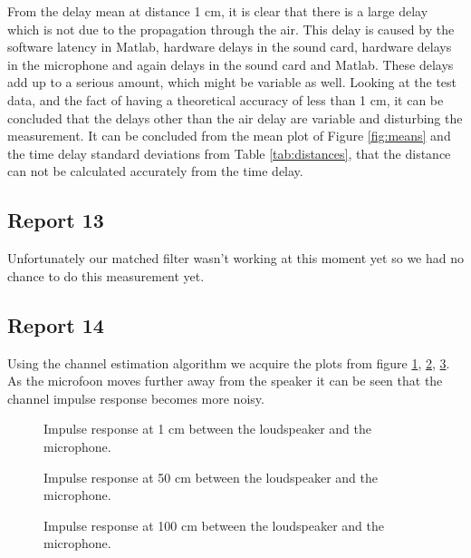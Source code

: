 \documentclass[final]{scrreprt} %
\begin{document}
From the delay mean at distance 1 cm, it is clear that there is a large delay which is not due to the propagation through the air.
This delay is caused by the software latency in Matlab, hardware delays in the sound card, hardware delays in the microphone and again delays in the sound card and Matlab.
These delays add up to a serious amount, which might be variable as well.
Looking at the test data, and the fact of having a theoretical accuracy of less than 1 cm, it can be concluded that the delays other than the air delay are variable and disturbing the measurement.
It can be concluded from the mean plot of Figure \ref{fig:means} and the time delay standard deviations from Table \ref{tab:distances}, that the distance can not be calculated accurately from the time delay.

\subsection{Report 13}
Unfortunately our matched filter wasn't working at this moment yet so we had no chance to do this measurement yet.
\subsection{Report 14}

Using the channel estimation algorithm we acquire the plots from figure \ref{fig:1cm}, \ref{fig:50cm}, \ref{fig:100cm}. As the microfoon moves further away from the speaker it can be seen that the channel impulse response becomes more noisy.

\begin{figure}[H]
	\centering
	\setlength\figureheight{4cm}
    	\setlength{}
	
	\caption{Impulse response at 1 cm between the loudspeaker and the microphone.}
	\label{fig:1cm}
\end{figure}

\begin{figure}[H]
	\centering
	\setlength\figureheight{4cm}
    	\setlength{}
	
	\caption{Impulse response at 50 cm between the loudspeaker and the microphone.}
	\label{fig:50cm}
\end{figure}

\begin{figure}[H]
	\centering
	\setlength\figureheight{4cm}
    	\setlength{}
	
	\caption{Impulse response at 100 cm between the loudspeaker and the microphone.}
	\label{fig:100cm}
\end{figure}
\end{document}
